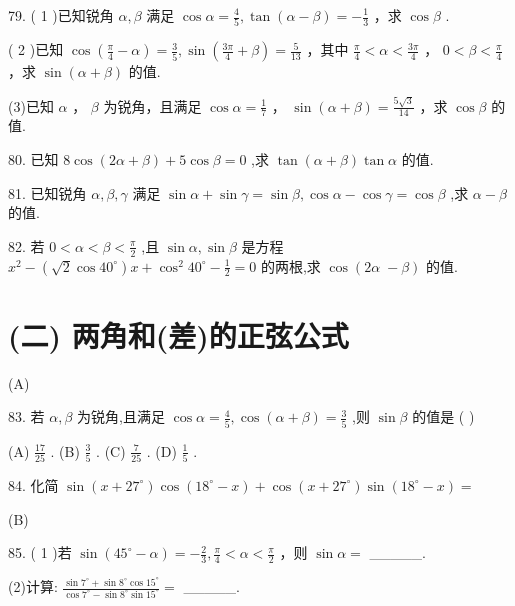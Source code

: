 \documentclass[10pt]{article}
\begin{document}
79. ( 1 )已知锐角 \(\alpha ,\beta\) 满足 \(\cos \alpha  = \frac{4}{5},\tan \left( {\alpha  - \beta }\right)  =  - \frac{1}{3}\) ，求 \(\cos \beta\) .

( 2 )已知 \(\cos \left( {\frac{\pi }{4} - \alpha }\right)  = \frac{3}{5},\sin \left( {\frac{3\pi }{4} + \beta }\right)  = \frac{5}{13}\) ，其中 \(\frac{\pi }{4} < \alpha  < \frac{3\pi }{4}\) ， \(0 < \beta  < \frac{\pi }{4}\) ，求 \(\sin \left( {\alpha  + \beta }\right)\) 的值.

(3)已知 \(\alpha\) ， \(\beta\) 为锐角，且满足 \(\cos \alpha  = \frac{1}{7}\) ， \(\sin \left( {\alpha  + \beta }\right)  = \frac{5\sqrt{3}}{14}\) ，求 \(\cos \beta\) 的值.

80. 已知 \(8\cos \left( {{2\alpha } + \beta }\right)  + 5\cos \beta  = 0\) ,求 \(\tan \left( {\alpha  + \beta }\right) \tan \alpha\) 的值.

81. 已知锐角 \(\alpha ,\beta ,\gamma\) 满足 \(\sin \alpha  + \sin \gamma  = \sin \beta ,\cos \alpha  - \cos \gamma  = \cos \beta\) ,求 \(\alpha  - \beta\) 的值.

82. 若 \(0 < \alpha  < \beta  < \frac{\pi }{2}\) ,且 \(\sin \alpha ,\sin \beta\) 是方程 \({x}^{2} - \left( {\sqrt{2}\cos {40}^{ \circ  }}\right) x + {\cos }^{2}{40}^{ \circ  } - \frac{1}{2} = 0\) 的两根,求 \(\cos ({2\alpha } \; - \beta )\) 的值.

\section*{(二) 两角和(差)的正弦公式}

(A)

83. 若 \(\alpha ,\beta\) 为锐角,且满足 \(\cos \alpha  = \frac{4}{5},\cos \left( {\alpha  + \beta }\right)  = \frac{3}{5}\) ,则 \(\sin \beta\) 的值是 ( )

(A) \(\frac{17}{25}\) . (B) \(\frac{3}{5}\) . (C) \(\frac{7}{25}\) . (D) \(\frac{1}{5}\) .

84. 化简 \(\sin \left( {x + {27}^{ \circ  }}\right) \cos \left( {{18}^{ \circ  } - x}\right)  + \cos \left( {x + {27}^{ \circ  }}\right) \sin \left( {{18}^{ \circ  } - x}\right)  =\)

(B)

85. ( 1 )若 \(\sin \left( {{45}^{ \circ  } - \alpha }\right)  =  - \frac{2}{3},\frac{\pi }{4} < \alpha  < \frac{\pi }{2}\) ，则 \(\sin \alpha  =\) \_\_\_\_\_.

(2)计算: \(\frac{\sin {7}^{ \circ  } + \sin {8}^{ \circ  }\cos {15}^{ \circ  }}{\cos {7}^{ \circ  } - \sin {8}^{ \circ  }\sin {15}^{ \circ  }} =\) \_\_\_\_\_.
\end{document}
